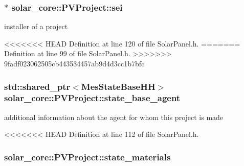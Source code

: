 \hypertarget{classsolar__core_1_1_p_v_project_af8fdd82137a3b0aa277ae6b9663fcb33}{}
\subsubsection[{sei}]{$\ast$ solar\+\_\+core\+::\+P\+V\+Project\+::sei}\label{classsolar__core_1_1_p_v_project_af8fdd82137a3b0aa277ae6b9663fcb33}
installer of a project 

<<<<<<< HEAD
Definition at line 120 of file Solar\+Panel.\+h.
=======
Definition at line 99 of file Solar\+Panel.\+h.
>>>>>>> 9fadf023062505cb443534457ab9d4d3cc1b7bfc

\hypertarget{classsolar__core_1_1_p_v_project_a1a3576ddac7b82f9a2d7c139af9850d2}{}
\subsubsection[{state\+\_\+base\+\_\+agent}]{\setlength{\rightskip}{0pt plus 5cm}std\+::shared\+\_\+ptr$<${\bf Mes\+State\+Base\+H\+H}$>$ solar\+\_\+core\+::\+P\+V\+Project\+::state\+\_\+base\+\_\+agent}\label{classsolar__core_1_1_p_v_project_a1a3576ddac7b82f9a2d7c139af9850d2}
additional information about the agent for whom this project is made 

<<<<<<< HEAD
Definition at line 112 of file Solar\+Panel.\+h.

\hypertarget{classsolar__core_1_1_p_v_project_aaac22e629b55f970a4ad43b1fcd756d1}{}
\subsubsection[{state\+\_\+materials}]{ solar\+\_\+core\+::\+P\+V\+Project\+::state\+\_\+materials}\label{classsolar__core_1_1_p_v_project_aaac22e629b55f970a4ad43b1fcd756d1}


